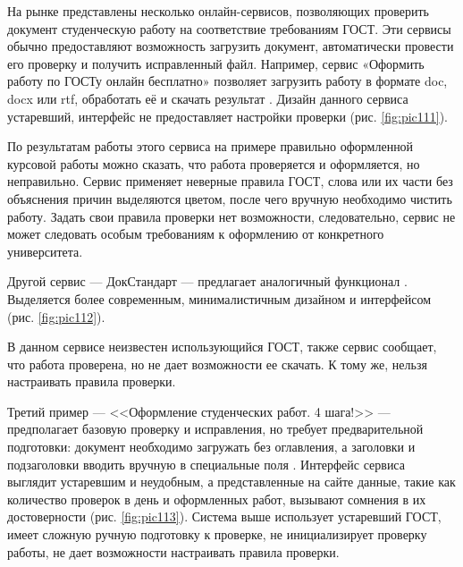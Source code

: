 \documentclass{report}
\begin{document}
На рынке представлены несколько онлайн-сервисов, позволяющих проверить документ студенческую работу на соответствие требованиям ГОСТ. Эти сервисы обычно предоставляют возможность загрузить документ, автоматически провести его проверку и получить исправленный файл. Например, сервис «Оформить работу по ГОСТу онлайн бесплатно»  позволяет загрузить работу в формате doc, docx или rtf, обработать её и скачать \break результат \cite{serv1}. Дизайн данного сервиса устаревший, интерфейс не предоставляет настройки проверки (рис. \ref{fig:pic111}).

\break

По результатам работы этого сервиса на примере правильно оформленной курсовой работы можно сказать, что работа проверяется и оформляется, но неправильно. Сервис применяет неверные правила ГОСТ, слова или их части без объяснения причин выделяются цветом, после чего вручную необходимо чистить работу. Задать свои правила проверки нет возможности, следовательно, сервис не может следовать особым требованиям к оформлению от конкретного университета.

Другой сервис --- ДокСтандарт --- предлагает аналогичный \break функционал \cite{serv2}. Выделяется более современным, минималистичным дизайном и интерфейсом (рис. \ref{fig:pic112}).


В данном сервисе неизвестен использующийся ГОСТ, также сервис сообщает, что работа проверена, но не дает возможности ее скачать. К тому же, нельзя настраивать правила проверки.

Третий пример --- <<Оформление студенческих работ. 4 шага!>> --- предполагает базовую проверку и исправления, но требует предварительной подготовки: документ необходимо загружать без оглавления, а заголовки и подзаголовки вводить вручную в специальные поля \cite{serv3}. Интерфейс сервиса выглядит устаревшим и неудобным, а представленные на сайте данные, такие как количество проверок в день и оформленных работ, вызывают сомнения в их достоверности (рис. \ref{fig:pic113}). Система выше использует устаревший ГОСТ, имеет сложную ручную подготовку к проверке, не инициализирует проверку работы, не дает возможности настраивать правила проверки.

\end{document}

